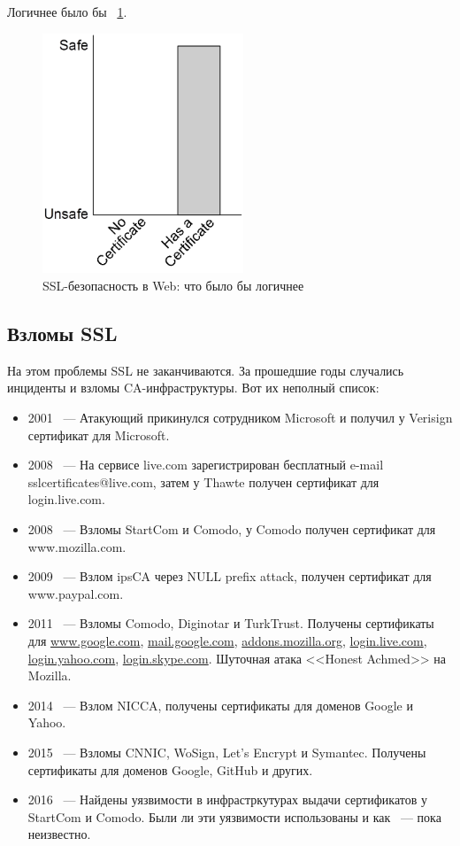 \documentclass[10pt, a5paper]{article}
\begin{document}
Логичнее было бы ~\ref{Hlebnikov6}.
\begin{center}
\begin{figure}[h!]
  \centering
  \includegraphics[width=6cm]{Hlebnikov6.png}
  \caption{SSL-безопасность в Web: что было бы логичнее}
  \label{Hlebnikov6}
\end{figure}
\end{center}
\subsection*{Взломы SSL}

На этом проблемы SSL не заканчиваются. За прошедшие годы случались
инциденты и взломы CA-инфраструктуры. Вот их неполный список:

\begin{itemize}
  \item 2001 ~--- Атакующий прикинулся сотрудником Microsoft и получил у
  Verisign сертификат для Microsoft.
  \item 2008 ~--- На сервисе live.com зарегистрирован бесплатный e-mail
  sslcertificates@live.com, затем у Thawte получен сертификат для
  login.live.com.
  \item 2008 ~--- Взломы StartCom и Comodo, у Comodo получен сертификат для
  www.mozilla.com.
  \item 2009 ~--- Взлом ipsCA через NULL prefix attack, получен сертификат для
  www.paypal.com.
  \item 2011 ~--- Взломы Comodo, Diginotar и TurkTrust. Получены сертификаты
  для \url{www.google.com}, \url{mail.google.com}, \linebreak \url{addons.mozilla.org},
  \url{login.live.com}, \url{login.yahoo.com}, \linebreak \url{login.skype.com}. Шуточная атака
  <<Honest Achmed>> на Mozilla.
  \item 2014 ~--- Взлом NICCA, получены сертификаты для доменов Google и Yahoo.
  \item 2015 ~--- Взломы CNNIC, WoSign, Let's Encrypt и Symantec. Получены
  сертификаты для доменов Google, GitHub и других.
  \item 2016 ~--- Найдены уязвимости в инфрастркутурах выдачи сертификатов у
  StartCom и Comodo. Были ли эти уязвимости использованы и как ~--- пока
  неизвестно.
\end{itemize}
\end{document}
